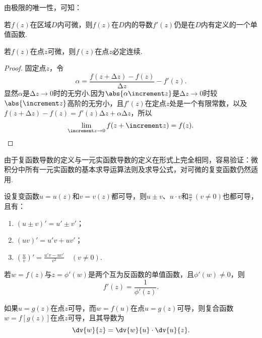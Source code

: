 由极限的唯一性，可知：
\begin{theorem}
若\(f(z)\)在区域\(D\)内可微，则\(f(z)\)在\(D\)内的导数\(f'(z)\)仍是在\(D\)内有定义的一个单值函数.
\end{theorem}

\begin{theorem}[可微的必要条件]
若\(f(z)\)在点\(z\)可微，则\(f(z)\)在点\(z\)必定连续.
\begin{proof}
固定点\(z\)，令\[
\alpha = \frac{f(z+\increment z)-f(z)}{\increment z} - f'(z).
\]显然\(\alpha\)是\(\increment z \to 0\)时的无穷小.因为\(\abs{\alpha \increment z}\)是\(\increment z \to 0\)时较\(\abs{\increment z}\)高阶的无穷小，且\(f'(z)\)在定点\(z\)处是一个有限常数，以及\(f(z+\increment z) - f(z) = f'(z) \increment z + \alpha \increment z\)，所以\[
\lim_{\increment z \to 0} f(z + \increment z) = f(z).
\qedhere
\]
\end{proof}
\end{theorem}

由于复函数导数的定义与一元实函数导数的定义在形式上完全相同，容易验证：微积分中所有一元实函数的基本求导运算法则及求导公式，对可微的复变函数仍然适用.
\begin{theorem}\label{theorem:解析函数.函数的和差积商的导数}
设复变函数\(u=u(z)\)和\(v=v(z)\)都可导，则\(u \pm v\)、\(u \cdot v\)和\(\frac{u}{v}\ (v\neq0)\)也都可导，且有：
\begin{enumerate}
\item \((u \pm v)' = u' \pm v'\)；
\item \((u v)' = u' v + u v'\)；
\item \(\left(\frac{u}{v}\right)' = \frac{u' v - u v'}{v^2} \quad (v \neq 0)\).
\end{enumerate}
\end{theorem}

\begin{theorem}\label{theorem:解析函数.反函数的导数}
若\(w=f(z)\)与\(z=\phi'(w)\)是两个互为反函数的单值函数，且\(\phi'(w) \neq 0\)，则\[
f'(z) = \frac{1}{\phi'(z)}.
\]
\end{theorem}

\begin{theorem}\label{theorem:解析函数.复合函数的导数}
如果\(u=g(z)\)在点\(z\)可导，而\(w=f(u)\)在点\(u=g(z)\)可导，则复合函数\(w=f[g(z)]\)在点\(z\)可导，且其导数为\[
\dv{w}{z} = \dv{w}{u} \cdot \dv{u}{z}.
\]
\end{theorem}

